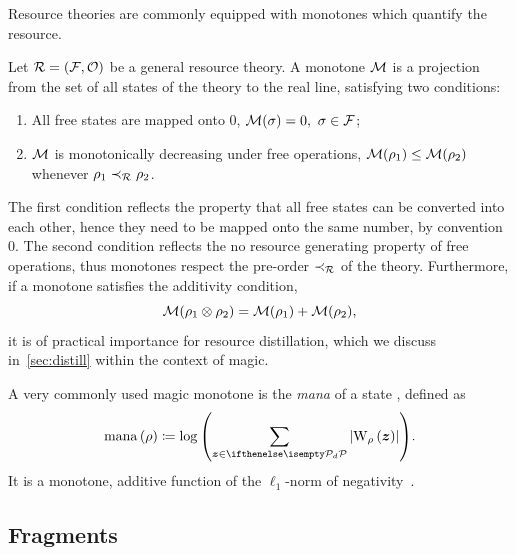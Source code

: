 \documentclass[pra,
aps,
twocolumn,
superscriptaddress,
groupedaddress,
nofootinbib,
reprint
]{revtex4-1}
\begin{document}
Resource theories are commonly equipped with monotones which quantify the resource. 
\begin{definition}\label{def:mono}
    Let $\mathcal{R} = (\mathcal{F}, \mathcal{O})$ be a general resource theory.
    A monotone $\mathcal{M}$ is a projection from the set of all states of the theory to the real line, satisfying two conditions:
    \begin{enumerate}
        \item All free states are mapped onto 0, $\mathcal{M}(\sigma) = 0,\ \sigma \in \mathcal{F}$;
        \item $\mathcal{M}$ is monotonically decreasing under free operations, $\mathcal{M}(\rho_1) \leq \mathcal{M}(\rho_2)$ whenever $\rho_1 \prec_{\mathcal{R}} \rho_2$.
    \end{enumerate}
\end{definition}
The first condition reflects the property that all free states can be converted into each other, hence they need to be mapped onto the same number, by convention 0.
The second condition reflects the no resource generating property of free operations, thus monotones respect the pre-order $\prec_{\mathcal{R}}$ of the theory.
Furthermore, if a monotone satisfies the additivity condition,
\begin{equation}
    \mathcal{M}(\rho_1 \otimes \rho_2) = \mathcal{M}(\rho_1) + \mathcal{M}(\rho_2),
\end{equation}
it is of practical importance for resource distillation, which we discuss in~\cref{sec:distill} within the context of magic.

A very commonly used magic monotone is the \emph{mana} of a state , defined as
\begin{equation}
    \mana{\rho} \coloneqq \log{\left(\sum\limits_{\bmz \in \pd} \abs{\W[\bmz]{\rho}}\right)}.
\end{equation}
It is a monotone, additive function of the $\ell_1$-norm of negativity~.

\subsection{Fragments}
\end{document}

